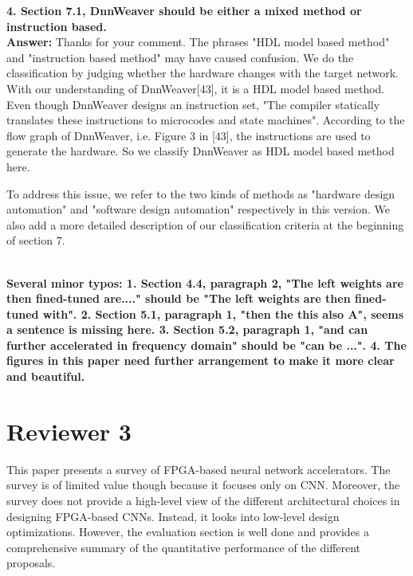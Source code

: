 \documentclass[12pt]{paper}
\newcommand{\rev}[1]{{{\color[rgb]{0,0,1}{#1}}}}
\newcommand{\reviewer}[1]{\section*{Reviewer #1}}
\newcommand{\answer}[1]{\noindent\textbf{Answer:} #1}
\newcommand{\comment}[1]{\noindent\textbf{#1}\\}
\begin{document}
\comment{4.	Section 7.1, DnnWeaver should be either a mixed method or instruction based.}

\answer{Thanks for your comment. The phrases "HDL model based method" and "instruction based method" may have caused confusion. We do the classification by judging whether the hardware changes with the target network. With our understanding of DnnWeaver[43], it is a HDL model based method. Even though DnnWeaver designs an instruction set, "The compiler statically translates these instructions to microcodes and state machines". According to the flow graph of DnnWeaver, i.e. Figure 3 in [43], the instructions are used to generate the hardware. So we classify DnnWeaver as HDL model based method here. 

To address this issue, we refer to the two kinds of methods as "hardware design automation" and "software design automation" respectively in this version. We also add a more detailed description of our classification criteria at the beginning of section 7.

\rev{In certain application senarios, various NN models are to be supported with the FPGA accelerator. Whether the accelerator can response to the change in network model promptly and keeps high performance becomes a key feature. To address this problem, various researches have been carried out to automatically map a NN model to FPGA. Mainly two kinds of methods are used: hardware design automation and software design automation. Hardware design automation generates different hardware designs according to different NN models. Software design automation keeps a same accelerator and generates different inputs to the accelerator.}}\\

\comment{Several minor typos:
1. Section 4.4, paragraph 2, "The left weights are then fined-tuned are...." should be "The left weights are then fined-tuned with".
2. Section 5.1, paragraph 1, "then the this also A", seems a sentence is missing here.
3. Section 5.2, paragraph 1, "and can further accelerated in frequency domain" should be "can be ...".
4. The figures in this paper need further arrangement to make it more clear and beautiful.}

\reviewer{3}

This paper presents a survey of FPGA-based neural network accelerators. The survey is of limited value though because it focuses only on CNN. Moreover, the survey does not provide a high-level view of the different architectural choices in designing FPGA-based CNNs. Instead, it looks into low-level design optimizations. However, the evaluation section is well done and provides a comprehensive summary of the quantitative performance of the different proposals.\\
\end{document}
